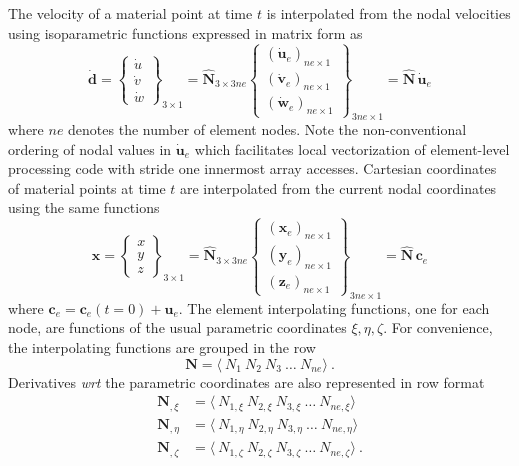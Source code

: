 \documentclass[11pt]{report}
\numberwithin{equation}{section}
\newcommand{\bmf } {\boldsymbol }  %
\newcommand{\ti}{\emph}
\newcommand{\nid}{\noindent}
\begin{document}
\nid The velocity of a material point at time $t$ is interpolated from the nodal 
velocities using isoparametric functions expressed in matrix form as
%
\begin{equation}\label{E:IF1}
\dot{\bmf{d}} =
 \begin{Bmatrix}\dot u \\ \dot v\\ \dot w\end{Bmatrix}_{3\times 1} = 
 \hat{\mathbf{N}}_{3\times3ne} \begin{Bmatrix} \left (\dot{\bmf{u}}_e\right )_{ne \times 1} 
 \\ \left (\dot{\bmf{v}}_e\right )_{ne \times 1} \\ 
 \left (\dot{\bmf{w}}_e\right )_{ne \times 1}\end{Bmatrix}_{3ne\times 1}  =
 \hat{\mathbf{N}} \, \dot{\bmf{u}}_e
\end{equation}
%
\nid where $ne$ denotes the number of element nodes. Note the non-conventional 
ordering of nodal values in $\dot{\bmf{u}}_e$ which facilitates local vectorization
of element-level processing code with stride one innermost array accesses.
Cartesian coordinates of material points at time $t$ are interpolated from the
current nodal coordinates using the same functions
%
\begin{equation}\label{E:IF2}
\bmf{x} =
 \begin{Bmatrix} x \\ y\\ z\end{Bmatrix}_{3\times 1} = 
 \hat{\mathbf{N}}_{3\times3ne} \begin{Bmatrix} \left (\bmf{x}_e\right )_{ne \times 1} 
 \\ \left ( \bmf{y}_e\right )_{ne \times 1} \\ 
 \left (\bmf{z}_e\right )_{ne \times 1}\end{Bmatrix}_{3ne\times 1}  =
 \hat{\mathbf{N}} \, \bmf{c}_e
\end{equation}
%
\nid where $\bmf{c}_e = \bmf{c}_e(t=0) + \bmf{u}_e$. The element interpolating functions, one for each
node, are functions of the usual parametric coordinates $\xi,  \eta, \zeta$.
For convenience, the interpolating functions are grouped in the row
%
\begin{equation}\label{E:IF3}
\bmf{N} = \langle \ N_1\ N_2\  N_3\  \dots\  N_{ne} \rangle\ .
\end{equation}
%
Derivatives \ti{wrt} the parametric coordinates are  also represented
in row format
%
\begin{equation}\label{E:IF4}
\begin{aligned}
\bmf{N}_{,\xi} &= \langle \ N_{1,\xi}\ N_{2,\xi}\  N_{3,\xi}\  \dots\  N_{ne,\xi} \rangle  \\
\bmf{N}_{,\eta}& = \langle \ N_{1,\eta}\ N_{2,\eta}\  N_{3,\eta}\  \dots\  N_{ne,\eta} \rangle  \\
\bmf{N}_{,\zeta}& = \langle \ N_{1,\zeta}\ N_{2,\zeta}\  N_{3,\zeta}\  \dots\  N_{ne,\zeta} \rangle \ .
\end{aligned}
\end{equation}
\end{document}
